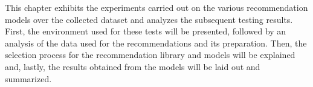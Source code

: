 This chapter exhibits the experiments carried out on the various recommendation models over the collected dataset and analyzes the subsequent testing results. First, the environment used for these tests will be presented, followed by an analysis of the data used for the recommendations and its preparation. Then, the selection process for the recommendation library and models will be explained and, lastly, the results obtained from the models will be laid out and summarized.